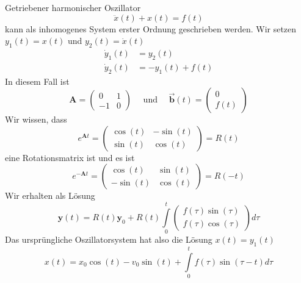    \begin{example}{Getriebener harmonischer Oszillator}
     \[\ddot{x}(t)+x(t)=f(t)\]
     kann als inhomogenes System erster Ordnung geschrieben werden. Wir setzen
     $y_1(t)=x(t)$ und $y_2(t)=\dot{x}(t)$
     \begin{align*}
       \dot{y}_1(t)&=y_2(t)\\
       \dot{y}_2(t)&=-y_1(t)+f(t)
     \end{align*}
     In diesem Fall ist
     \[\mathbf{A}=
       \begin{pmatrix}
	 0&1\\ -1&0
       \end{pmatrix}\quad
       \mbox{ und }\quad
       \vec{\mathbf{b}}(t)=\begin{pmatrix}0\\ f(t)\end{pmatrix}
     \]
     Wir wissen, dass
     \[e^{\mathbf{A}t}=
       \begin{pmatrix}
	 \cos(t)&-\sin(t)\\ \sin(t)&\cos(t)
       \end{pmatrix}
       =R(t)
     \]
     eine Rotationsmatrix ist und es ist
     \[e^{-\mathbf{A}t}=
       \begin{pmatrix}
         \cos(t)&\sin(t)\\-\sin(t)&\cos(t)
       \end{pmatrix}
       =R(-t)
     \]
     Wir erhalten als Lösung
     \[\mathbf{y}(t)=R(t)\mathbf{y}_0 + 
       R(t)\int\limits_0^t\begin{pmatrix}f(\tau)\sin(\tau)\\f(\tau)\cos(\tau)\end{pmatrix}d\tau
     \]
     Das ursprüngliche Oszillatorsystem hat also die Lösung $x(t)=y_1(t)$
     \[ x(t)=x_0\cos(t)-v_0\sin(t)+\int\limits_0^tf(\tau)\sin(\tau -t)d\tau \]
   \end{example}